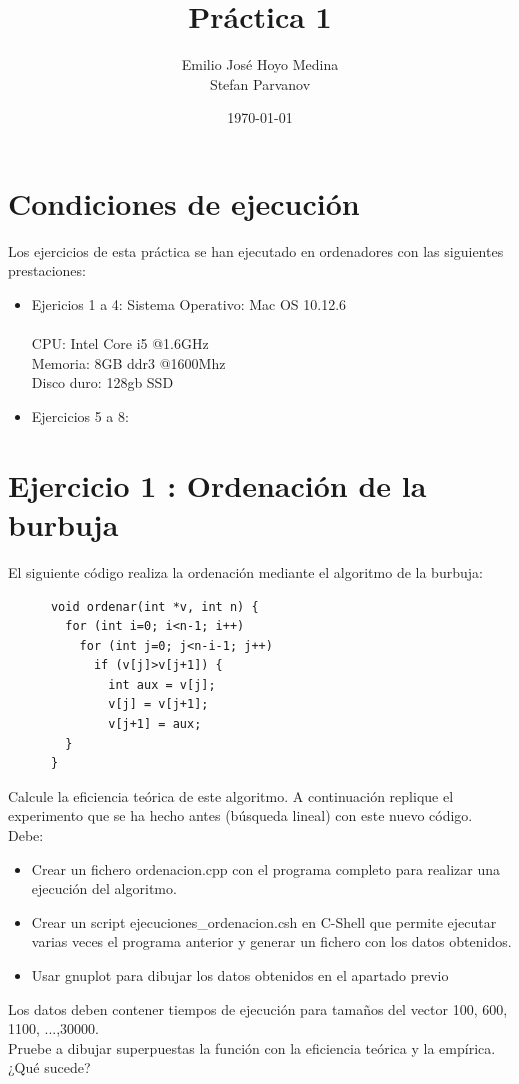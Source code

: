 \documentclass{article}
\begin{document}
\lstset{numbers=left}
      
\title{Práctica 1}
\author{Emilio José Hoyo Medina\\ Stefan Parvanov}
\date{\today}
\maketitle



\clearpage
\section{Condiciones de ejecución}
Los ejercicios de esta práctica se han ejecutado en ordenadores con las siguientes prestaciones:
\begin{itemize}
	\item Ejericios 1 a 4:
	Sistema Operativo: Mac OS 10.12.6 \\ \\
	CPU: Intel Core i5 @1.6GHz	\\
	Memoria: 8GB ddr3 @1600Mhz	\\	
	Disco duro: 128gb SSD		\\
	\item Ejercicios 5 a 8:
\end{itemize}

\section{Ejercicio 1 : Ordenación de la burbuja}
El siguiente código realiza la ordenación mediante el algoritmo de la burbuja:
\begin{lstlisting}
      void ordenar(int *v, int n) {
        for (int i=0; i<n-1; i++)
          for (int j=0; j<n-i-1; j++)
            if (v[j]>v[j+1]) {
              int aux = v[j];
              v[j] = v[j+1];
              v[j+1] = aux;
		} 
      }
\end{lstlisting}

Calcule la eficiencia teórica de este algoritmo. A continuación replique el experimento que se ha hecho antes (búsqueda lineal) con este nuevo código. Debe:
\begin{itemize}
	\item Crear un fichero ordenacion.cpp con el programa completo para realizar una ejecución del algoritmo.
	\item Crear un script ejecuciones\_ordenacion.csh en C-Shell que permite ejecutar varias veces el programa anterior y generar un fichero con los datos obtenidos.
	\item Usar gnuplot para dibujar los datos obtenidos en el apartado previo
\end{itemize}
Los datos deben contener tiempos de ejecución para tamaños del vector 100, 600, 1100, ...,30000. \\
Pruebe a dibujar superpuestas la función con la eficiencia teórica y la empírica. ¿Qué sucede? 
\clearpage
\end{document}
